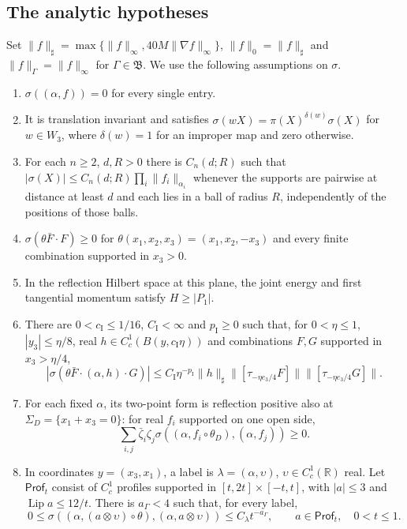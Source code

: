 \documentclass[11pt,letterpaper,reqno]{amsart}
\theoremstyle{definition}
\theoremstyle{remark}
\begin{document}
\subsection{The analytic hypotheses}

Set $\|f\|_\sharp=\max\{\|f\|_\infty,
40M\|\nabla f\|_\infty\}$,
$\|f\|_0=\|f\|_\sharp$ and
$\|f\|_\Gamma=\|f\|_\infty$ for $\Gamma\in\mathfrak B$.
We use the following assumptions on $\sigma$.
\begin{enumerate}
\item[(R0)] $\sigma((\alpha,f))=0$ for every single entry.
\item[(R1)] It is translation invariant and satisfies
$\sigma(wX)=\pi(X)^{\delta(w)}\sigma(X)$ for $w\in W_3$,
where $\delta(w)=1$ for an improper map and zero otherwise.
\item[(R2)] For each $n\ge2$, $d,R>0$ there is
$C_n(d;R)$ such that
$|\sigma(X)|\le C_n(d;R)\prod_i\|f_i\|_{\alpha_i}$
whenever the supports are pairwise at distance at least
$d$ and each lies in a ball of radius $R$, independently
of the positions of those balls.
\item[(R3)] $\sigma(\theta\bar F\cdot F)\ge0$ for
$\theta(x_1,x_2,x_3)=(x_1,x_2,-x_3)$ and every finite
combination supported in $x_3>0$.
\item[(R4)] In the reflection Hilbert space at this plane,
the joint energy and first tangential momentum satisfy
$H\ge|P_1|$.
\item[(R5)] There are $0<c_{\mathrm I}\le1/16$,
$C_{\mathrm I}<\infty$ and $p_{\mathrm I}\ge0$ such that,
for $0<\eta\le1$, $|y_3|\le\eta/8$, real
$h\in C_c^1(B(y,c_{\mathrm I}\eta))$ and combinations
$F,G$ supported in $x_3>\eta/4$,
\[
 |\sigma(\theta\bar F\cdot(\alpha,h)\cdot G)|
 \le C_{\mathrm I}\eta^{-p_{\mathrm I}}\|h\|_\sharp
 \|[\tau_{-\eta e_3/4}F]\|
 \|[\tau_{-\eta e_3/4}G]\|.
\]
\item[(R6)] For each fixed $\alpha$, its two-point form
is reflection positive also at
$\Sigma_D=\{x_1+x_3=0\}$: for real $f_i$ supported on
one open side,
\[
 \sum_{i,j}\bar\zeta_i\zeta_j
 \sigma((\alpha,f_i\circ\theta_D),(\alpha,f_j))\ge0.
\]
\item[(R7)] In coordinates $y=(x_3,x_1)$, a label is
$\lambda=(\alpha,\upsilon)$, $\upsilon\in C_c^1(\mathbb R)$
real.  Let $\mathsf{Prof}_t$ consist of $C_c^1$ profiles
supported in $[t,2t]\times[-t,t]$, with
$|a|\le3$ and $\operatorname{Lip}a\le12/t$.
There is $a_\Gamma<4$ such that, for every label,
\[
 0\le\sigma((\alpha,(a\otimes\upsilon)\circ\theta),
                         (\alpha,a\otimes\upsilon))
       \le C_\lambda t^{-a_\Gamma},
 \qquad a\in\mathsf{Prof}_t,\quad0<t\le1.
\]
\end{enumerate}
\end{document}
